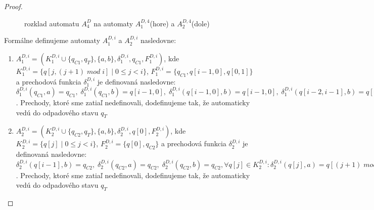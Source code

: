\begin{proof}
\begin{figure}[H]
\caption{rozklad automatu $ A_4^D $ na automaty $ A_1^{D,4}$(hore) a $ A_2^{D,4} $(dole)}
\end{figure}

Formálne definujeme automaty $ A_1^{D,i}$ a $ A_2^{D,i} $ nasledovne:
\begin{enumerate}
\item $ A_1^{D,i} = (K_1^{D,i} \cup \lbrace q_{C1}, q_T \rbrace, \lbrace a,b \rbrace, \delta_1^{D,i}, q_{C1}, F_1^{D,i}) $, kde $ K_1^{D,i} = \lbrace q[j,(j+1) \; mod \; i] \; | \; 0 \leq j < i \rbrace $, $ F_1^{D,i} = \lbrace q_{C1}, q[i-1,0],q[0,1] \rbrace$ a prechodová funkcia $ \delta_1^{D,i} $ je definovaná nasledovne: $ \delta_1^{D,i}(q_{C1},a) = q_{C1}, \; \delta_1^{D,i}(q_{C1},b) = q[i-1,0], \; \delta_1^{D,i}(q[i-1,0],b) = q[i-1,0], \; \delta_1^{D,i}(q[i-2,i-1],b) = q[i-1,0], \; \forall q[j,k] \in K_1^{D,i} : \delta_1^{D,i}(q[j,k],a) = \lbrace q[(j+1) \; mod \; i, (k+1) \; mod \; i] \rbrace $. Prechody, ktoré sme zatiaľ nedefinovali, dodefinujeme tak, že automaticky vedú do odpadového stavu $ q_T $ 
\item $ A_2^{D,i} = (K_2^{D,i} \cup \lbrace q_{C2}, q_T \rbrace, \lbrace a,b \rbrace, \delta_2^{D,i}, q[0], F_2^{D,i}) $, kde $ K_2^{D,i} = \lbrace q[j] \; | \; 0 \leq j < i \rbrace $, $ F_2^{D,i} = \lbrace q[0], q_{C2} \rbrace $ a prechodová funkcia $ \delta_2^{D,i} $ je definovaná nasledovne: $ \delta_2^{D,i}(q[i-1],b) = q_{C2}, \; \delta_2^{D,i}(q_{C2},a) = q_{C2}, \; \delta_2^{D,i}(q_{C2},b) = q_{C2}, \forall q[j] \in K_2^{D,i} : \delta_2^{D,i}(q[j],a) = q[(j+1) \; mod \; i] $. Prechody, ktoré sme zatiaľ nedefinovali, dodefinujeme tak, že automaticky vedú do odpadového stavu $ q_T $
\end{enumerate}


\end{proof}
